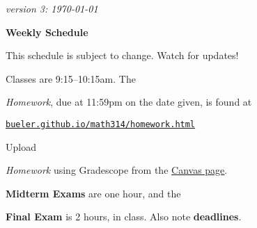 \documentclass[12pt]{article}
\newcommand{\due}[1]{\strut {\color{BrickRed} \textsl{#1}}}
\newcommand{\ee}[1]{\strut {\color{Blue} \textbf{#1}}}
\newcommand{\dlinline}[1]{{\color{Purple} \textbf{#1}}}
\newcommand{\dl}[1]{{\small \dlinline{#1}}}
\begin{document}
\hfill \small \emph{version 3: \today} \normalsize

\bigskip\bigskip
\centerline{\Large \textbf{Weekly Schedule}}

\bigskip
This schedule is subject to change.  Watch for updates!

Classes are 9:15--10:15am.  The \due{Homework}, due at 11:59pm on the date given, is found at

 \quad \href{https://bueler.github.io/math314/homework.html}{\underline{\texttt{bueler.github.io/math314/homework.html}}}
 
Upload \due{Homework} using Gradescope from the \href{https://canvas.alaska.edu/courses/7017}{\underline{Canvas page}}.  \ee{Midterm Exams} are one hour, and the \ee{Final Exam} is 2 hours, in class.  Also note \dl{deadlines}.

\bigskip
\end{document}
